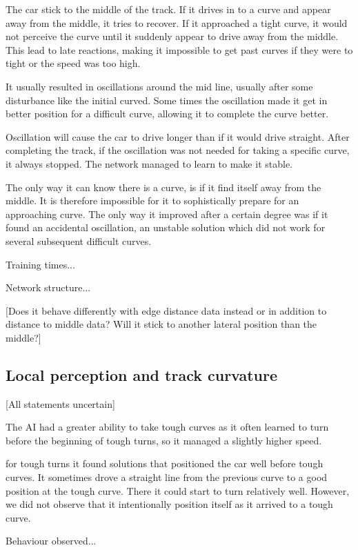 The car stick to the middle of the track. If it drives in to a curve and appear away from the middle, it tries to recover. If it approached a tight curve, it would not perceive the curve until it suddenly appear to drive away from the middle. This lead to late reactions, making it impossible to get past curves if they were to tight or the speed was too high.

It usually resulted in oscillations around the mid line, usually after some disturbance like the initial curved. Some times the oscillation made it get in better position for a difficult curve, allowing it to complete the curve better. 

Oscillation will cause the car to drive longer than if it would drive straight. After completing the track, if the oscillation was not needed for taking a specific curve, it always stopped. The network managed to learn to make it stable. 

The only way it can know there is a curve, is if it find itself away from the middle. It is therefore impossible for it to sophistically prepare for an approaching curve. The only way it improved after a certain degree was if it found an accidental oscillation, an unstable solution which did not work for several subsequent difficult curves.

Training times...

Network structure... 

[Does it behave differently with edge distance data instead or in addition to distance to middle data? Will it stick to another lateral position than the middle?]


\subsection{Local perception and track curvature}

[All statements uncertain]

The AI had a greater ability to take tough curves as it often learned to turn before the beginning of tough turns, so it managed a slightly higher speed.

for tough turns it found solutions that positioned the car well before tough curves. It sometimes drove a straight line from the previous curve to a good position at the tough curve. There it could start to turn relatively well. However, we did not observe that it intentionally position itself as it arrived to a tough curve.

Behaviour observed...

